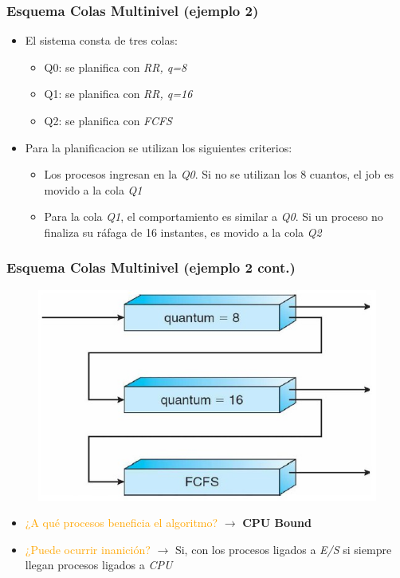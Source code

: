 \begin{frame}
  \frametitle{Esquema \textbf{Colas Multinivel} (ejemplo 2)}
  \begin{itemize}
  		\item El sistema consta de tres colas:
  		\begin{itemize}
  			\item Q0: se planifica con \emph{RR, q=8}
  			\item Q1: se planifica con \emph{RR, q=16}
  			\item Q2: se planifica con \emph{FCFS}
  		\end{itemize}
  		\item Para la planificacion se utilizan los siguientes criterios:
  		\begin{itemize}
  			\item Los procesos ingresan en la \emph{Q0}. Si no se utilizan los 8 cuantos, el job es movido a la cola \emph{Q1}
  			\item Para la cola \emph{Q1}, el comportamiento es similar a \emph{Q0}. Si un proceso no finaliza su ráfaga de 16 instantes, es movido a la cola \emph{Q2}
  		\end{itemize}
  \end{itemize}
\end{frame}

\begin{frame}
  \frametitle{Esquema \textbf{Colas Multinivel} (ejemplo 2 cont.)}
	\begin{figure}
    	\includegraphics[scale=0.4]{images/multilevelSchemaExample2.png}
	\end{figure}
	\begin{itemize}
		\pause
		\item \textcolor{orange}{¿A qué procesos beneficia el algoritmo?}
		\pause
		$\rightarrow$ \textbf{CPU Bound}
	\pause  			
		\item \textcolor{orange}{¿Puede ocurrir inanición?}
	\pause
		$\rightarrow$ Si, con los procesos ligados a \emph{E/S} si siempre llegan procesos ligados a \emph{CPU}
	\end{itemize}
\end{frame}

